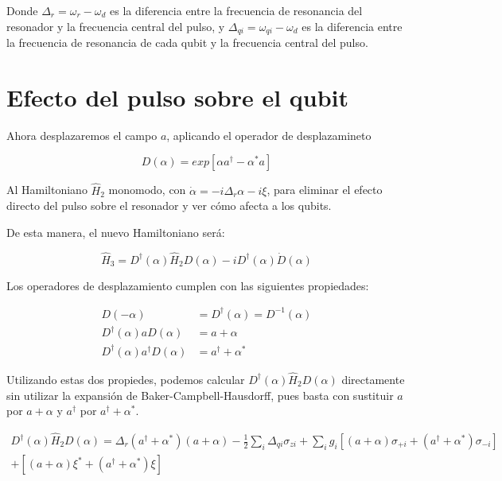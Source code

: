 Donde $\Delta_r = \omega_r - \omega_d$ es la diferencia entre la frecuencia de resonancia del resonador y la frecuencia central del pulso, y $\Delta_{qi} = \omega_{qi} - \omega_d$ es la diferencia entre la frecuencia de resonancia de cada qubit y la frecuencia central del pulso.

\section{Efecto del pulso sobre el qubit}

Ahora desplazaremos el campo $a$, aplicando el operador de desplazamineto

\begin{equation}
    D(\alpha) = exp[\alpha a^\dagger - \alpha^* a]
\end{equation}

Al Hamiltoniano $\hat{H}_2$ monomodo, con $\dot{\alpha} = -i \Delta_r \alpha -i \xi$, para eliminar el efecto directo del pulso sobre el resonador y ver cómo afecta a los qubits.

De esta manera, el nuevo Hamiltoniano será:

\begin{equation}
    \hat{H}_3 = D^\dagger (\alpha) \hat{H}_2 D(\alpha) -i D^\dagger(\alpha) \dot{D}(\alpha)
\end{equation}

Los operadores de desplazamiento cumplen con las siguientes propiedades:

\begin{align}
    D(-\alpha) &= D^\dagger(\alpha) = D^{-1}(\alpha) \\
    D^\dagger(\alpha) a D(\alpha) &= a + \alpha \\
    D^\dagger(\alpha) a^\dagger D(\alpha) &= a^\dagger + \alpha^*
\end{align}

Utilizando estas dos propiedes, podemos calcular $D^\dagger(\alpha) \hat{H}_2 D(\alpha)$ directamente sin utilizar la expansión de Baker-Campbell-Hausdorff, pues basta con sustituir $a$ por $a+\alpha$ y $a^\dagger$ por $a^\dagger+\alpha^*$.

\begin{multline}
  D^\dagger(\alpha) \hat{H}_2 D(\alpha) = \Delta_r (a^\dagger + \alpha^*) (a + \alpha) - \frac{1}{2} \sum\limits_i \Delta_{qi} \sigma_{zi} + \sum\limits_i g_i [(a+\alpha) \sigma_{+ i} + (a^\dagger+\alpha^*) \sigma_{- i}] \\
  + [(a+\alpha)\xi^*+(a^\dagger+\alpha^*)\xi]
\end{multline}

